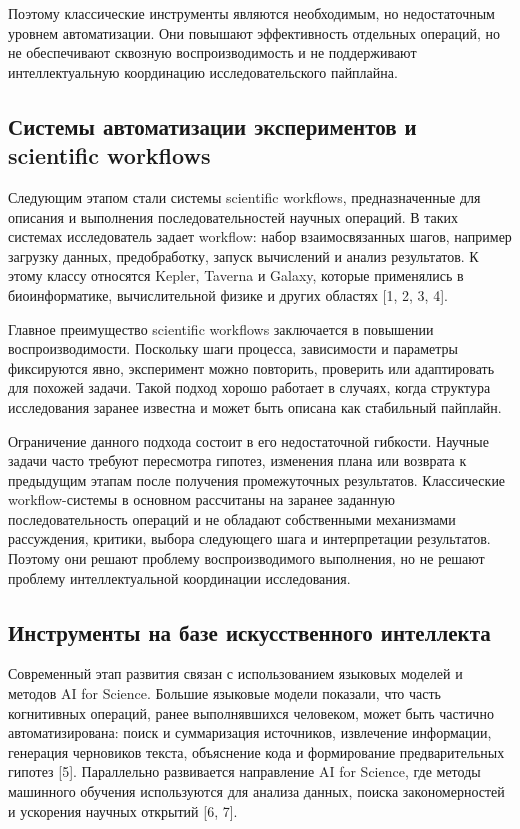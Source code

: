 Поэтому классические инструменты являются необходимым, но недостаточным уровнем автоматизации. Они повышают эффективность отдельных операций, но не обеспечивают сквозную воспроизводимость и не поддерживают интеллектуальную координацию исследовательского пайплайна.

\subsection{Системы автоматизации экспериментов и scientific workflows}

Следующим этапом стали системы scientific workflows, предназначенные для описания и выполнения последовательностей научных операций. В таких системах исследователь задает workflow: набор взаимосвязанных шагов, например загрузку данных, предобработку, запуск вычислений и анализ результатов. К этому классу относятся Kepler, Taverna и Galaxy, которые применялись в биоинформатике, вычислительной физике и других областях [1, 2, 3, 4].

Главное преимущество scientific workflows заключается в повышении воспроизводимости. Поскольку шаги процесса, зависимости и параметры фиксируются явно, эксперимент можно повторить, проверить или адаптировать для похожей задачи. Такой подход хорошо работает в случаях, когда структура исследования заранее известна и может быть описана как стабильный пайплайн.

Ограничение данного подхода состоит в его недостаточной гибкости. Научные задачи часто требуют пересмотра гипотез, изменения плана или возврата к предыдущим этапам после получения промежуточных результатов. Классические workflow-системы в основном рассчитаны на заранее заданную последовательность операций и не обладают собственными механизмами рассуждения, критики, выбора следующего шага и интерпретации результатов. Поэтому они решают проблему воспроизводимого выполнения, но не решают проблему интеллектуальной координации исследования.

\subsection{Инструменты на базе искусственного интеллекта}

Современный этап развития связан с использованием языковых моделей и методов AI for Science. Большие языковые модели показали, что часть когнитивных операций, ранее выполнявшихся человеком, может быть частично автоматизирована: поиск и суммаризация источников, извлечение информации, генерация черновиков текста, объяснение кода и формирование предварительных гипотез [5]. Параллельно развивается направление AI for Science, где методы машинного обучения используются для анализа данных, поиска закономерностей и ускорения научных открытий [6, 7].

